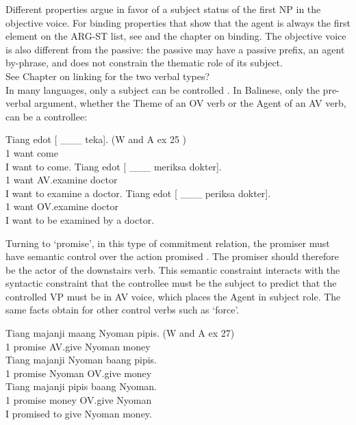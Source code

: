 \documentclass[output=paper]{langsci/langscibook}
\begin{document}
Different properties argue in favor of a subject status of the first NP in the objective voice. For binding properties that show that the agent is always the first element on the ARG-ST list, see \citet{WechslerandArka1998,ManningandSag1998} and the chapter on binding. The objective voice is also different from the passive: the passive may have a passive prefix, an agent by-phrase, and does not constrain the thematic role of its subject.\\
See Chapter on linking for the two verbal types?\\

In many languages, only a subject
can be controlled \citep{Zaenenetal1985}. In Balinese, only the pre-verbal argument, whether the Theme of an OV verb or the Agent of an AV verb, can be a controllee:

\begin{exe}
\ex \begin{xlist}
\ex \gll Tiang edot [ \_\_\_ teka]. (W and A ex 25 )\\
1 want come \\
\glt I want to come.
\ex \gll Tiang edot [ \_\_\_  meriksa dokter].\\
1 want AV.examine doctor\\
\glt I want to examine a doctor.
\ex \gll Tiang edot [ \_\_\_ periksa dokter].\\
1 want OV.examine doctor\\
\glt I want to be examined by a doctor.
\end{xlist}
\end{exe}

Turning to  ‘promise’, in this type of commitment relation, the promiser must have semantic control over the action promised \citet{Farkas1988,Kroeger1993,SagandPollard1991}. The promiser should therefore be the actor of the downstairs verb. This semantic constraint interacts with the syntactic constraint that the controllee must be the subject to predict that the controlled VP must be in AV voice, which places the Agent in subject role. The same facts obtain for other control verbs such as  ‘force’.

\begin{exe}
\ex \begin{xlist}
\ex \gll Tiang majanji maang Nyoman pipis. (W and A ex 27)\\
1 promise AV.give Nyoman money \\
\ex \gll *Tiang majanji Nyoman baang pipis. \\
1 promise Nyoman OV.give money \\
\ex \gll *Tiang majanji pipis baang Nyoman. \\
1 promise money OV.give Nyoman\\ 
\glt I promised to give Nyoman money. 
\end{xlist}
\end{exe}
\end{document}
